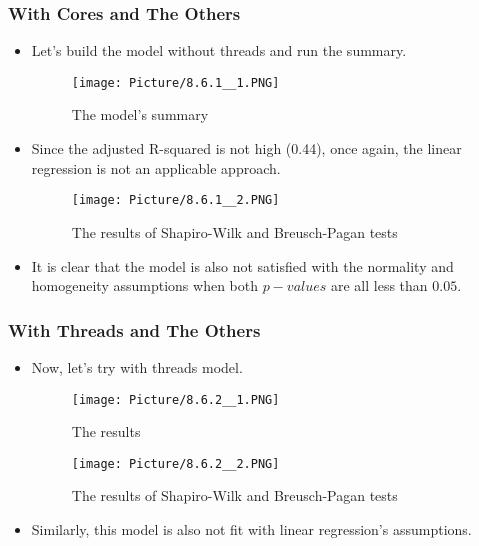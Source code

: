 \documentclass[a4paper]{article}
\begin{document}
\subsubsection{With Cores and The Others}
\begin{itemize}
    \item[] Let's build the model without threads and run the summary.

    \begin{figure}[H]
        \centering
        \texttt{[image: Picture/8.6.1\_\_1.PNG]}
        \caption{The model's summary}
    \end{figure}

    \item[] Since the adjusted R-squared is not high (0.44), once again, the linear regression is not an applicable approach. 

    \begin{figure}[H]
        \centering
        \texttt{[image: Picture/8.6.1\_\_2.PNG]}
        \caption{The results of Shapiro-Wilk and Breusch-Pagan tests}
    \end{figure}

    \item[] It is clear that the model is also not satisfied with the normality and homogeneity assumptions when both $p-values$ are all less than $0.05$.
\end{itemize}

\subsubsection{With Threads and The Others}
\begin{itemize}

\item[]Now, let's try with threads model.

\begin{figure}[H]
    \centering
    \texttt{[image: Picture/8.6.2\_\_1.PNG]}
    \caption{The results}
\end{figure}

\begin{figure}[H]
    \centering
    \texttt{[image: Picture/8.6.2\_\_2.PNG]}
    \caption{The results of Shapiro-Wilk and Breusch-Pagan tests}
\end{figure}

\item[]Similarly, this model is also not fit with linear regression’s assumptions.
\end{itemize}
\end{document}
